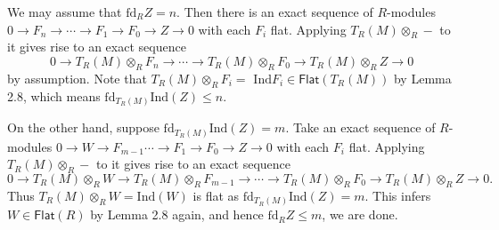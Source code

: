 \documentclass[10pt,twoside]{amsart}
\theoremstyle{bfupright head,slanted body}
\theoremstyle{bfupright head,upright body}
\theoremstyle{fixed bf head,slanted body}
\theoremstyle{fixed bf head,upright body}
\theoremstyle{numbered paragraph}
\newenvironment{prf*}[1][Proof]{%
  \begin{proof}[\bf #1]
    \setcounter{equation}{0}
    \renewcommand{\theequation}{\arabic{equation}}}
  {\end{proof}
  }
\numberwithin{equation}{res}
\newcommand{\fd}{\mathrm{fd}}
\newcommand{\Flat}{\mathsf{Flat}}
\newcommand{\Ind}{\mathrm{Ind}}
\begin{document}
\begin{prf*}
We may assume that $\fd_R Z= n$.
Then there is an exact sequence of $R$-modules
$0\to F_{n}\to \cdots\to F_{1}\to F_{0}\to Z\to 0$
with each $F_{i}$ flat. Applying $T_R(M)\otimes_{R}-$ to it gives rise to an exact sequence
$$0\to T_R(M)\otimes_{R}F_{n}\to \cdots\to T_R(M)\otimes_{R}F_{0}\to T_R(M)\otimes_{R}Z\to 0$$ 
by assumption. Note that $T_R(M)\otimes_{R}F_{i}=$ $\Ind F_{i}\in \Flat(T_R(M))$ by Lemma 2.8,
which means $\fd_{T_R(M)}\Ind(Z) \leqslant n$.

On the other hand, suppose $\fd_{T_R(M)}\Ind(Z)= m$. Take an exact sequence of $R$-modules
$0\to W\to F_{m-1}\cdots\to F_{1}\to F_{0}\to Z\to 0$ with each $F_{i}$ flat.
Applying $T_R(M)\otimes_{R}-$ to it gives rise to an exact sequence
$$0\to T_R(M)\otimes_{R}W\to T_R(M)\otimes_{R}F_{m-1}\to \cdots\to T_R(M)\otimes_{R}F_{0}\to T_R(M)\otimes_{R}Z\to 0.$$ 
Thus $T_R(M)\otimes_{R}W =\Ind(W)$ is flat as $\fd_{T_R(M)}\Ind(Z) = m$.
This infers $W\in\Flat(R)$ by Lemma 2.8 again, and hence $\fd_R Z \leqslant m$, we are done.
 \end{prf*}
\end{document}
